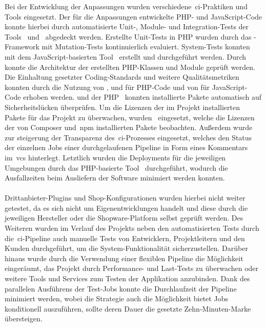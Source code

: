 Bei der Entwicklung der Anpassungen wurden verschiedene\ \acrshort{ci}-Praktiken und Tools eingesetzt.
Der für die Anpassungen entwickelte PHP- und JavaScript-Code konnte hierbei durch automatisierte Unit-, Module- und
Integration-Tests der Tools\  und\  abgedeckt werden.
Erstellte Unit-Tests in PHP wurden durch das -Framework mit Mutation-Tests kontinuierlich
evaluiert.
System-Tests konnten mit dem JavaScript-basierten Tool\  erstellt und durchgeführt werden.
Durch\  konnte die Architektur der erstellten PHP-Klassen und Module geprüft werden.
Die Einhaltung gesetzter Coding-Standards und weitere Qualitätsmetriken konnten durch die Nutzung von
,  und  für PHP-Code und von  für
JavaScript-Code erhoben werden.
 und der PHP\  konnten installierte Pakete automatisch auf
Sicherheitslücken überprüfen.
Um die Lizenzen der im Projekt installierten Pakete für das Projekt zu überwachen, wurden\ 
eingesetzt, welche die Lizenzen der von Composer und\ \acrshort{npm} installierten Pakete beobachten.
Außerdem wurde\  zur steigerung der Transparenz des\ \acrshort{ci}-Prozesses eingesetzt, welches
den Status der einzelnen Jobs einer durchgelaufenen Pipeline in Form eines Kommentars im\ \acrshort{vcs} hinterlegt.
Letztlich wurden die Deployments für die jeweiligen Umgebungen durch das PHP-basierte Tool\ 
durchgeführt, wodurch die Ausfallzeiten beim Ausliefern der Software minimiert werden konnten.
\\\\
Drittanbieter-Plugins und Shop-Konfigurationen wurden hierbei nicht weiter getestet, da es sich nicht um
Eigenentwicklungen handelt und diese durch die jeweiligen Hersteller oder die Shopware-Platform selbst geprüft werden.
Des Weiteren wurden im Verlauf des Projekts neben den automatisierten Tests durch die\ \acrshort{ci}-Pipeline auch
manuelle Tests von Entwicklern, Projektleitern und den Kunden durchgeführt, um die System-Funktionalität
sicherzustellen.
Darüber hinaus wurde durch die Verwendung einer flexiblen Pipeline die Möglichkeit eingeräumt, das Projekt durch
Performance- und Last-Tests zu überwachen oder weitere Tools und Services zum Testen der Applikation anzubinden.
Dank des parallelen Ausführens der Test-Jobs konnte die Durchlaufzeit der Pipeline minimiert werden, wobei die
Strategie auch die Möglichkeit bietet Jobs konditionell auszuführen, sollte deren Dauer die gesetzte Zehn-Minuten-Marke
übersteigen.

\clearpage
